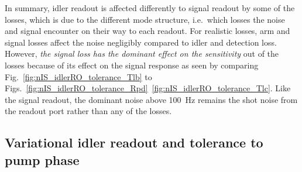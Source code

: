 In summary, idler readout is affected differently to signal readout by some of the losses, which is due to the different mode structure, i.e.\ which losses the noise and signal encounter on their way to each readout.
For realistic losses, arm and signal losses affect the noise negligibly compared to idler and detection loss. However, \emph{the signal loss has the dominant effect on the sensitivity} out of the losses because of its effect on the signal response as seen by comparing Fig.~\ref{fig:nIS_idlerRO_tolerance_Tlb} to Figs.~\ref{fig:nIS_idlerRO_tolerance_Rpd}~\ref{fig:nIS_idlerRO_tolerance_Tlc}. Like the signal readout, the dominant noise above 100~Hz remains the shot noise from the readout port rather than any of the losses.



\subsection{Variational idler readout and tolerance to pump phase}
\label{sec:idlerRO_pump_phase}

